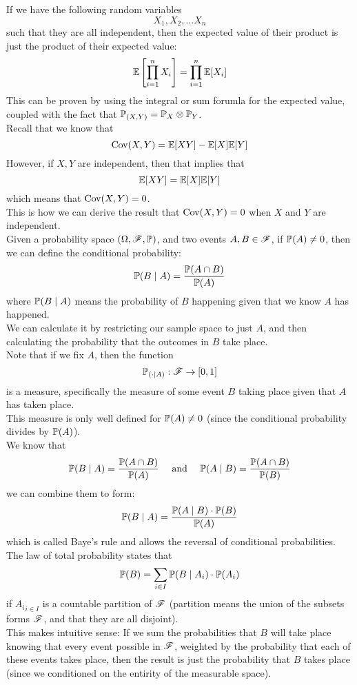 \documentclass[12pt]{article}
\begin{document}
    If we have the following random
    variables
    \[ X_1, X_2, \dots X_n \]
    such that they are all independent,
    then the expected value of their
    product is just the product
    of their expected value:
    \[ \mathbb{E}\left[ \prod_{i=1}^{n}
    X_i \right] = \prod_{i=1}^{n}\mathbb{E}[X_i] \]
    This can be proven by 
    using the integral or sum
    forumla for the expected
    value, coupled with the fact that
    $ \mathbb{P}_{(X, Y)}
    = \mathbb{P}_X \otimes \mathbb{P}_Y $. \\
    
    Recall that we know that
    \[ \text{Cov}(X, Y) = \mathbb{E}[XY] - \mathbb{E}[X]\mathbb{E}[Y] \]
    However, if $X, Y$
    are independent,
    then that implies that 
    \[ \mathbb{E}[XY] = \mathbb{E}[X]\mathbb{E}[Y] \]
    which means that $\text{Cov}(X, Y) = 0$. \\
    This is how we can derive the
    result that $\text{Cov}(X, Y) = 0$
    when $X$ and $Y$
    are independent. \\

    Given a probability space
    $(\Omega, \mathscr{F}, \mathbb{P})$,
    and two events $A, B \in \mathscr{F}$,
    if $\mathbb{P}(A) \neq 0$,
    then we can define the conditional
    probability:
    \[ \mathbb{P}(B \mid A)
    = \dfrac{\mathbb{P}(A \cap B)}{\mathbb{P}(A)} \]
    where $\mathbb{P}(B \mid A)$
    means the probability of $B$
    happening given that we know $A$
    has happened. \\
    We can calculate it by restricting
    our sample space to just $A$,
    and then calculating the probability
    that the outcomes in $B$
    take place. \\

    Note that if we fix $A$,
    then the function
    \[ \mathbb{P}_{(\cdot \mid A)}: \mathscr{F} \to
    [0, 1] \]
    is a measure,
    specifically the measure of some
    event $B$ taking place given
    that $A$ has taken place. \\
    This measure is only well defined
    for $\mathbb{P}(A) \neq 0$
    (since the conditional probability
    divides by $\mathbb{P}(A)$). \\

    We know that
    \[ \mathbb{P}(B \mid A)
    = \dfrac{\mathbb{P}(A \cap B)}{\mathbb{P}(A)} 
    \quad \text{ and } \quad 
    \mathbb{P}(A \mid B)
    = \dfrac{\mathbb{P}(A \cap B)}{\mathbb{P}(B)} \]
    we can combine them to form:
    \[ \mathbb{P}(B \mid A)
    = \dfrac{\mathbb{P}(A \mid B) \cdot \mathbb{P}(B)}
    {\mathbb{P}(A)} \]
    which is called Baye's rule and allows
    the reversal of conditional
    probabilities. \\

    The law of total probability states that
    \[ \mathbb{P}(B)
    = \sum_{i \in I}\mathbb{P}(B \mid A_i)
    \cdot \mathbb{P}(A_i) \]
    if ${A_i}_{i \in I}$
    is a countable partition of $\mathscr{F}$
    (partition means the union of the subsets
    forms $\mathscr{F}$, and that they are all
    disjoint). \\
    This makes intuitive sense:
    If we sum the probabilities that $B$
    will take place knowing
    that every event possible in $\mathscr{F}$,
    weighted by the probability
    that each of these events takes place,
    then the result is just the probability
    that $B$ takes place (since we conditioned
    on the entirity of the 
    measurable space). \\
\end{document}
